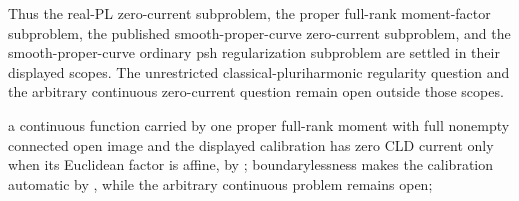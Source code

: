 Thus the real-PL zero-current subproblem, the proper full-rank moment-factor
subproblem, the published smooth-proper-curve zero-current subproblem, and
the smooth-proper-curve ordinary psh regularization subproblem are settled in
their displayed scopes.  The unrestricted classical-pluriharmonic regularity
question and the arbitrary continuous zero-current question remain open
outside those scopes.

\item a continuous function carried by one proper full-rank moment with full
      nonempty connected open image and the displayed calibration has zero CLD current
      only when its Euclidean factor is affine, by
      ; boundarylessness makes the
      calibration automatic by
      , while the
      arbitrary continuous problem remains open;
